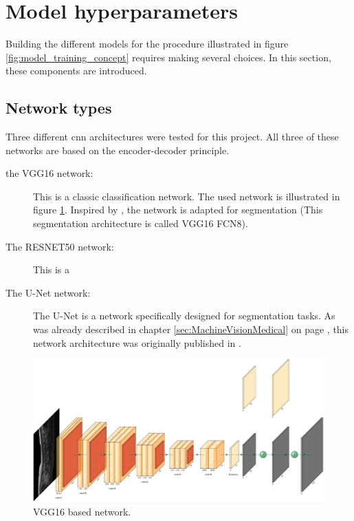 \section{Model hyperparameters}

Building the different models for the procedure illustrated in figure \ref{fig:model_training_concept} requires making several choices.
In this section, these components are introduced.

\subsection{Network types\label{sec:network_types}}

Three different \acrlong{cnn} architectures were tested for this project.
All three of these networks are based on the encoder-decoder principle.

\begin{description}
    \item[the VGG16 network: ] This is a classic classification network. 
    The used network is illustrated in figure \ref{fig:vgg16}. 
    Inspired by \cite{Laradji2020}, the network is adapted for segmentation (This segmentation architecture is called VGG16 FCN8).
    \item[The RESNET50 network:] This is a 
    \item[The U-Net network: ] The U-Net is a network specifically designed for segmentation tasks. As was already described in chapter \ref{sec:MachineVisionMedical} on page \pageref{sec:MachineVisionMedical}, this network architecture was originally published in \cite{Ronneberger2015}.
\end{description}

\begin{figure}
    \centering
    \includegraphics[width=.95\textwidth]{vgg16_upscore.pdf}
    \caption{VGG16 based network. \label{fig:vgg16}}
\end{figure}

